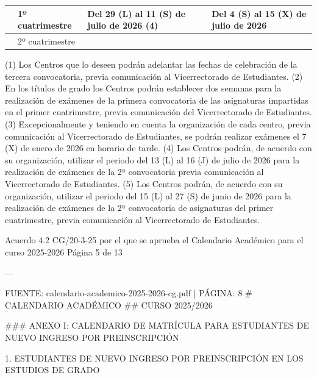 \documentclass{article}
\begin{document}
\begin{itemize}
\begin{itemize}
\begin{scriptsize}
\begin{table}[h!]
\begin{tabular}{|p{}|p{}|p{}|p{}|p{}|}
                                           & 1º cuatrimestre & Del 29 (L) al 11 (S) de julio de 2026 (4)          &                                                          & Del 4 (S) al 15 (X) de julio de 2026  \\\hline
                                           & 2º cuatrimestre &                                                    &                                                          &                                       \\\hline
                    \end{tabular}\end{table}
                  \vspace{0.4cm}

                  (1) Los Centros que lo deseen podrán adelantar las fechas de celebración de la tercera convocatoria, previa comunicación al Vicerrectorado de Estudiantes.
                  (2) En los títulos de grado los Centros podrán establecer dos semanas para la realización de exámenes de la primera convocatoria de las asignaturas impartidas en el primer cuatrimestre, previa comunicación del Vicerrectorado de Estudiantes.
                  (3) Excepcionalmente y teniendo en cuenta la organización de cada centro, previa comunicación al Vicerrectorado de Estudiantes, se podrán realizar exámenes el 7 (X) de enero de 2026 en horario de tarde.
                  (4) Los Centros podrán, de acuerdo con su organización, utilizar el periodo del 13 (L) al 16 (J) de julio de 2026 para la realización de exámenes de la 2ª convocatoria previa comunicación al Vicerrectorado de Estudiantes.
                  (5) Los Centros podrán, de acuerdo con su organización, utilizar el periodo del 15 (L) al 27 (S) de junio de 2026 para la realización de exámenes de la 2ª convocatoria de asignaturas del primer cuatrimestre, previa comunicación al Vicerrectorado de Estudiantes.

                  Acuerdo 4.2 CG/20-3-25 por el que se aprueba el Calendario Académico para el curso 2025-2026  Página 5 de 13

                  ---

                  FUENTE: calendario-academico-2025-2026-cg.pdf | PÁGINA: 8
                  \# CALENDARIO ACADÉMICO
                  \#\# CURSO 2025/2026

                  \#\#\# ANEXO I: CALENDARIO DE MATRÍCULA PARA ESTUDIANTES DE NUEVO INGRESO POR PREINSCRIPCIÓN

                  1. ESTUDIANTES DE NUEVO INGRESO POR PREINSCRIPCIÓN EN LOS ESTUDIOS DE GRADO


\end{scriptsize}
\end{itemize}
\end{itemize}
\end{document}
